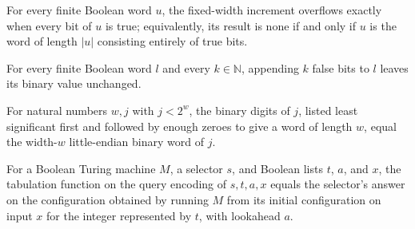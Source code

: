 \begin{theorem}
\label{Complexity.Meyer.incFixed_eq_none_iff}
\leanok
{}
For every finite Boolean word $u$, the fixed-width increment overflows exactly when
every bit of $u$ is true; equivalently, its result is none if and only if $u$ is the
word of length $|u|$ consisting entirely of true bits.
\end{theorem}

\begin{theorem}
\label{Complexity.Meyer.ctrVal_append_zeros}
\leanok
{}
For every finite Boolean word $l$ and every $k\in\mathbb{N}$, appending $k$ false bits
to $l$ leaves its binary value unchanged.
\end{theorem}

\begin{theorem}
\label{Complexity.Meyer.bits_pad}
\leanok
{}
For natural numbers $w,j$ with $j<2^w$, the binary digits of $j$, listed least
significant first and followed by enough zeroes to give a word of length $w$, equal the
width-$w$ little-endian binary word of $j$.
\end{theorem}

\begin{theorem}
\label{Complexity.Meyer.tabFun_query}
\leanok
{}
For a Boolean Turing machine $M$, a selector $s$, and Boolean lists $t$, $a$, and $x$,
the tabulation function on the query encoding of $s,t,a,x$ equals the selector’s answer
on the configuration obtained by running $M$ from its initial configuration on input $x$
for the integer represented by $t$, with lookahead $a$.
\end{theorem}
